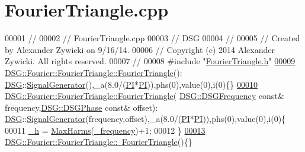 \hypertarget{_fourier_triangle_8cpp_source}{\section{Fourier\+Triangle.\+cpp}
\label{_fourier_triangle_8cpp_source}
}

\begin{DoxyCode}
00001 \textcolor{comment}{//}
00002 \textcolor{comment}{//  FourierTriangle.cpp}
00003 \textcolor{comment}{//  DSG}
00004 \textcolor{comment}{//}
00005 \textcolor{comment}{//  Created by Alexander Zywicki on 9/16/14.}
00006 \textcolor{comment}{//  Copyright (c) 2014 Alexander Zywicki. All rights reserved.}
00007 \textcolor{comment}{//}
00008 \textcolor{preprocessor}{#include "\hyperlink{_fourier_triangle_8h}{FourierTriangle.h}"}
\hypertarget{_fourier_triangle_8cpp_source_l00009}{}\hyperlink{class_d_s_g_1_1_fourier_1_1_fourier_triangle_a4129c053eddd87256ae39552a06ce329}{00009} \hyperlink{class_d_s_g_1_1_fourier_1_1_fourier_triangle_a4129c053eddd87256ae39552a06ce329}{DSG::Fourier::FourierTriangle::FourierTriangle}():
      \hyperlink{namespace_d_s_g}{DSG}::\hyperlink{class_d_s_g_1_1_signal_generator}{SignalGenerator}(),\_a(8.0/(\hyperlink{_p_i_8h_a598a3330b3c21701223ee0ca14316eca}{PI}*\hyperlink{_p_i_8h_a598a3330b3c21701223ee0ca14316eca}{PI})),phs(0),value(0),i(0)\{\}
\hypertarget{_fourier_triangle_8cpp_source_l00010}{}\hyperlink{class_d_s_g_1_1_fourier_1_1_fourier_triangle_abf887c6f5aada92780224511988cb688}{00010} \hyperlink{class_d_s_g_1_1_fourier_1_1_fourier_triangle_a4129c053eddd87256ae39552a06ce329}{DSG::Fourier::FourierTriangle::FourierTriangle}(
      \hyperlink{namespace_d_s_g_a4315a061386fa1014fda09b15d3a6973}{DSG::DSGFrequency} \textcolor{keyword}{const}& frequency,\hyperlink{namespace_d_s_g_a44431ce1eb0a7300efdd207bc879e52c}{DSG::DSGPhase} \textcolor{keyword}{const}& offset):
      \hyperlink{namespace_d_s_g}{DSG}::\hyperlink{class_d_s_g_1_1_signal_generator}{SignalGenerator}(frequency,offset),\_a(8.0/(\hyperlink{_p_i_8h_a598a3330b3c21701223ee0ca14316eca}{PI}*\hyperlink{_p_i_8h_a598a3330b3c21701223ee0ca14316eca}{PI})),phs(0),value(0),i(0)\{
00011     \hyperlink{class_d_s_g_1_1_fourier_1_1_fourier_triangle_a6fe21fae0d58d6221602e4bd74c30a80}{\_h} = \hyperlink{namespace_d_s_g_ab5c4eea42ea10b69cfc32afb83ff1d0d}{MaxHarms}(\hyperlink{class_d_s_g_1_1_signal_generator_a335e7ef058848eca368be51d8544d143}{\_frequency})+1;
00012 \}
\hypertarget{_fourier_triangle_8cpp_source_l00013}{}\hyperlink{class_d_s_g_1_1_fourier_1_1_fourier_triangle_a780bfb898d144200ff2bfb48849b4d24}{00013} \hyperlink{class_d_s_g_1_1_fourier_1_1_fourier_triangle_a780bfb898d144200ff2bfb48849b4d24}{DSG::Fourier::FourierTriangle::~FourierTriangle}()\{\}
\end{DoxyCode}
